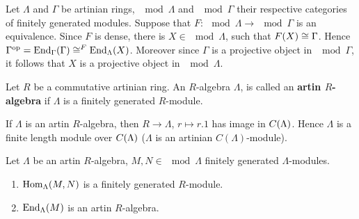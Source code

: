 
Let $\Lambda$ and $\Gamma$ be artinian rings, $\mod{\Lambda}$ and $\mod{\Gamma}$ their respective
categories of finitely generated modules. Suppose that $F: \mod{\Lambda} \to \mod{\Gamma}$ is
an equivalence. Since $F$ is dense, there is $X \in \mod{\Lambda}$, such that $F(X) \cong \Gamma$.
Hence $\Gamma^{\mathrm{op}} = \operatorname{End}_\Gamma(\Gamma) \cong^F \operatorname{End}_\Lambda(X)$. Moreover since $\Gamma$ is a projective
object in $\mod{\Gamma}$, it follows that $X$ is a projective object in $\mod{\Lambda}$.


\begin{definition}
Let $R$ be a commutative artinian ring. An $R$-algebra $\Lambda$, is called an
\textbf{artin $R$-algebra} if $\Lambda$ is a finitely generated $R$-module.
\end{definition}


If $\Lambda$ is an artin $R$-algebra, then $R \to \Lambda$, $r \mapsto r.1$ has image in
$C(\Lambda)$. Hence $\Lambda$ is a finite length module over $C(\Lambda)$ ($\Lambda$ is an
artinian $C(\Lambda)$-module).


\begin{lemma}\label{3.2.1}
  Let $\Lambda$ be an artin $R$-algebra, $M, N \in \mod{\Lambda}$ finitely generated $\Lambda$-modules.
  \begin{enumerate}
  \item $\operatorname{Hom}_\Lambda(M,N)$ is a finitely generated $R$-module.
  \item $\operatorname{End}_\Lambda(M)$ is an artin $R$-algebra.
  \end{enumerate}
\end{lemma}


